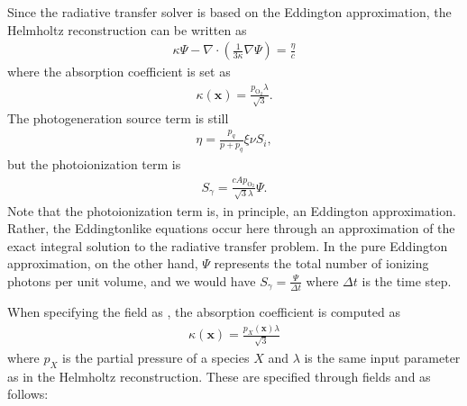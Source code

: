 \documentclass[letterpaper,10pt,english]{sphinxmanual}
\begin{document}
\sphinxAtStartPar
Since the radiative transfer solver is based on the Eddington approximation, the Helmholtz reconstruction can be written as
\begin{equation*}
\begin{split}\kappa \Psi - \nabla\cdot\left(\frac{1}{3\kappa}\nabla \Psi\right) = \frac{\eta}{c}\end{split}
\end{equation*}
\sphinxAtStartPar
where the absorption coefficient is set as
\begin{equation*}
\begin{split}\kappa(\mathbf{x}) = \frac{p_{\textrm{O}_2}\lambda}{\sqrt{3}}.\end{split}
\end{equation*}
\sphinxAtStartPar
The photogeneration source term is still
\begin{equation*}
\begin{split}\eta = \frac{p_q}{p + p_q}\xi\nu S_i,\end{split}
\end{equation*}
\sphinxAtStartPar
but the photoionization term is
\begin{equation*}
\begin{split}S_\gamma = \frac{c A p_{\textrm{O}_2}}{\sqrt{3}\lambda}\Psi.\end{split}
\end{equation*}
\sphinxAtStartPar
Note that the photoionization term is, in principle,  an Eddington approximation.
Rather, the Eddington\sphinxhyphen{}like equations occur here through an approximation of the exact integral solution to the radiative transfer problem.
In the pure Eddington approximation, on the other hand, \(\Psi\) represents the total number of ionizing photons per unit volume, and we would have \(S_\gamma = \frac{\Psi}{\Delta t}\) where \(\Delta t\) is the time step.

\sphinxAtStartPar
When specifying the  field as , the absorption coefficient is computed as
\begin{equation*}
\begin{split}\kappa(\mathbf{x}) = \frac{p_X\left(\mathbf{x}\right)\lambda}{\sqrt{3}}\end{split}
\end{equation*}
\sphinxAtStartPar
where \(p_X\) is the partial pressure of a species \(X\) and \(\lambda\) is the same input parameter as in the Helmholtz reconstruction.
These are specified through fields  and  as follows:
\end{document}

